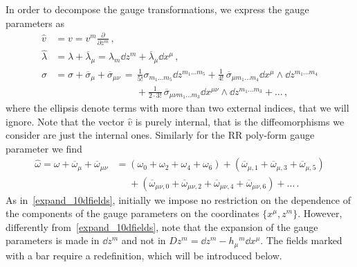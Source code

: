 \documentclass[debug]{phd}
\begin{document}
					In order to decompose the gauge transformations, we express the gauge parameters as
							\begin{equation}\label{10d_gauge_param}
								\begin{split}
									{\hat{v}} &= v = v^m \frac{\partial}{\partial z^m}\,, \\[1mm]
									\hat{\lambda} &= \lambda + \overline{\lambda}_\mu = \lambda_m \dd{z}^m + \overline{\lambda}_\mu \dd{x}^\mu \, , \\
\hat\sigma &= \sigma + \overline{\sigma}_\mu + \overline{\sigma}_{\mu\nu} \, =\, \tfrac{1}{5!}\sigma_{m_1\ldots m_5}\dd z^{m_1\ldots m_5} + \tfrac{1}{4!}\,\overline{\sigma}_{\mu m_1\ldots m_4}\dd x^\mu\wedge \dd z^{m_1\ldots m_4}
 \\
\,&\qquad \qquad \qquad \qquad\,\ + \tfrac{1}{2\cdot3!}\,\overline{\sigma}_{\mu\nu m_1\ldots m_3}\dd x^{\mu\nu}\wedge \dd z^{m_1\ldots m_3} + \ldots \, ,
								\end{split}
							\end{equation}
					where the ellipsis denote terms with more than two external indices, that we will ignore. 
					Note that the vector $\hat v$ is purely internal, that is the diffeomorphisms we consider are just the internal ones. Similarly for the RR poly-form gauge parameter we find
							\begin{equation}
								\begin{split}
									\hat\omega = \omega + \overline{\omega}_\mu + \overline\omega_{\mu\nu} & = (\omega_0+\omega_2+\omega_4+\omega_6) + (\overline{\omega}_{\mu,1}+ \overline{\omega}_{\mu,3}+\overline{\omega}_{\mu,5}) \\
															& \phantom{=} + (\overline{\omega}_{\mu\nu,0}+\overline{\omega}_{\mu\nu,2}+\overline{\omega}_{\mu\nu,4}+\overline{\omega}_{\mu\nu,6}) + \ldots \, .
								\end{split}
							\end{equation}
					As in~\eqref{expand_10dfields}, initially we impose no restriction on the dependence of the components of the gauge parameters on the coordinates $\{x^\mu,z^m\}$. 
					However, differently from~\eqref{expand_10dfields}, note that the expansion of the gauge parameters is made in $\dd{z}^m$ and not in $Dz^m=\dd z^m - h_\mu{}^m \dd x^\mu$. 
					The fields marked with a bar require a redefinition, which will be introduced below.
\end{document}
